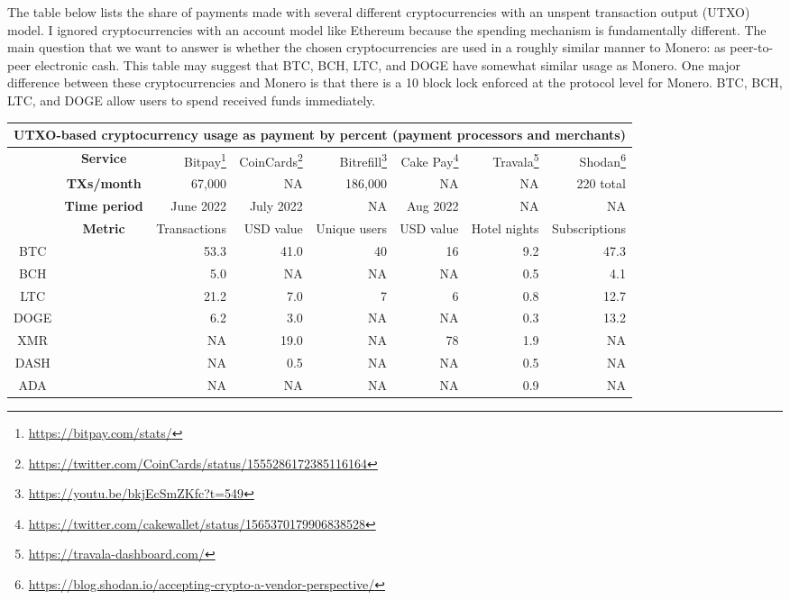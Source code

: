 \documentclass[english]{article}
\providecommand{\tabularnewline}{\\}
\begin{document}
The table below lists the share of payments made with several different
cryptocurrencies with an unspent transaction output (UTXO) model.
I ignored cryptocurrencies with an account model like Ethereum because
the spending mechanism is fundamentally different. The main question
that we want to answer is whether the chosen cryptocurrencies are
used in a roughly similar manner to Monero: as peer-to-peer electronic
cash. This table may suggest that BTC, BCH, LTC, and DOGE have somewhat
similar usage as Monero. One major difference between these cryptocurrencies
and Monero is that there is a 10 block lock enforced at the protocol
level for Monero. BTC, BCH, LTC, and DOGE allow users to spend received
funds immediately.
\begin{center}
\begin{tabular}{|c|c|r|r|r|r|r|r|}
\hline 
\multicolumn{8}{|c|}{\textbf{UTXO-based cryptocurrency usage as payment by percent (payment
processors and merchants)}}\tabularnewline
\hline 
 & \textbf{Service} & Bitpay\footnote{\href{https://bitpay.com/stats/}{https://bitpay.com/stats/}} & CoinCards\footnote{\href{https://twitter.com/CoinCards/status/1555286172385116164}{https://twitter.com/CoinCards/status/1555286172385116164}} & Bitrefill\footnote{\href{https://youtu.be/bkjEcSmZKfc?t=549}{https://youtu.be/bkjEcSmZKfc?t=549}} & Cake Pay\footnote{\href{https://twitter.com/cakewallet/status/1565370179906838528}{https://twitter.com/cakewallet/status/1565370179906838528}} & Travala\footnote{\href{https://travala-dashboard.com/}{https://travala-dashboard.com/}} & Shodan\footnote{\href{https://blog.shodan.io/accepting-crypto-a-vendor-perspective/}{https://blog.shodan.io/accepting-crypto-a-vendor-perspective/}}\tabularnewline
\hline 
\hline 
 & \textbf{TXs/month} & 67,000 & NA & 186,000 & NA & NA & 220 total\tabularnewline
\hline 
 & \textbf{Time period} & June 2022 & July 2022 & NA & Aug 2022 & NA & NA\tabularnewline
\hline 
 & \textbf{Metric} & Transactions & USD value & Unique users & USD value & Hotel nights & Subscriptions\tabularnewline
\hline 
BTC &  & 53.3 & 41.0 & 40 & 16 & 9.2 & 47.3\tabularnewline
\hline 
BCH &  & 5.0 & NA & NA & NA & 0.5 & 4.1\tabularnewline
\hline 
LTC &  & 21.2 & 7.0 & 7 & 6 & 0.8 & 12.7\tabularnewline
\hline 
DOGE &  & 6.2 & 3.0 & NA & NA & 0.3 & 13.2\tabularnewline
\hline 
XMR &  & NA & 19.0 & NA & 78 & 1.9 & NA\tabularnewline
\hline 
DASH &  & NA & 0.5 & NA & NA & 0.5 & NA\tabularnewline
\hline 
ADA &  & NA & NA & NA & NA & 0.9 & NA\tabularnewline
\hline 
\end{tabular}
\par\end{center}
\end{document}
